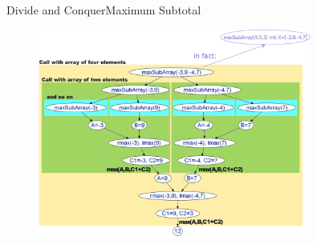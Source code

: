 \begin{frame}{Divide and Conquer}{Maximum Subtotal}
  \begin{figure}
    \includegraphics[width=0.8\textwidth]{Images/DivideAndConquer/maxsubarray.pdf}
    \label{fig:divide_and_conquer:max_sub_array_example}
  \end{figure}
\end{frame}





